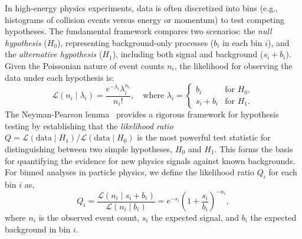 In high-energy physics experiments, data is often discretized into bins (e.g., histograms of collision events versus energy or momentum) to test competing hypotheses. The fundamental framework compares two scenarios: the \textit{null hypothesis} ($H_0$), representing background-only processes ($b_i$ in each bin $i$), and the \textit{alternative hypothesis} ($H_1$), including both signal and background ($s_i + b_i$). Given the Poissonian nature of event counts $n_i$, the likelihood for observing the data under each hypothesis is:
\begin{equation}
    \mathcal{L}(n_i \mid \lambda_i) = \frac{e^{-\lambda_i} \lambda_i^{n_i}}{n_i!}, \quad \text{where } \lambda_i = 
    \begin{cases}
        b_i & \text{for } H_0, \\
        s_i + b_i & \text{for } H_1.
    \end{cases}
\end{equation}
The Neyman-Pearson lemma~\cite{NeymanPearson1933} provides a rigorous framework for hypothesis testing by establishing that the \textit{likelihood ratio} $Q = \mathcal{L}(\text{data} \mid H_1)/\mathcal{L}(\text{data} \mid H_0)$ is the most powerful test statistic for distinguishing between two simple hypotheses, $H_0$ and $H_1$. This forms the basis for quantifying the evidence for new physics signals against known backgrounds. For binned analyses in particle physics, we define the likelihood ratio $Q_i$ for each bin $i$ as,
\begin{equation}
Q_i = \frac{\mathcal{L}(n_i \mid s_i + b_i)}{\mathcal{L}(n_i \mid b_i)} = e^{-s_i} \left( 1+\frac{s_i}{b_i} \right)^{-n_i},
\end{equation}
where $n_i$ is the observed event count, $s_i$ the expected signal, and $b_i$ the expected background in bin $i$. 


